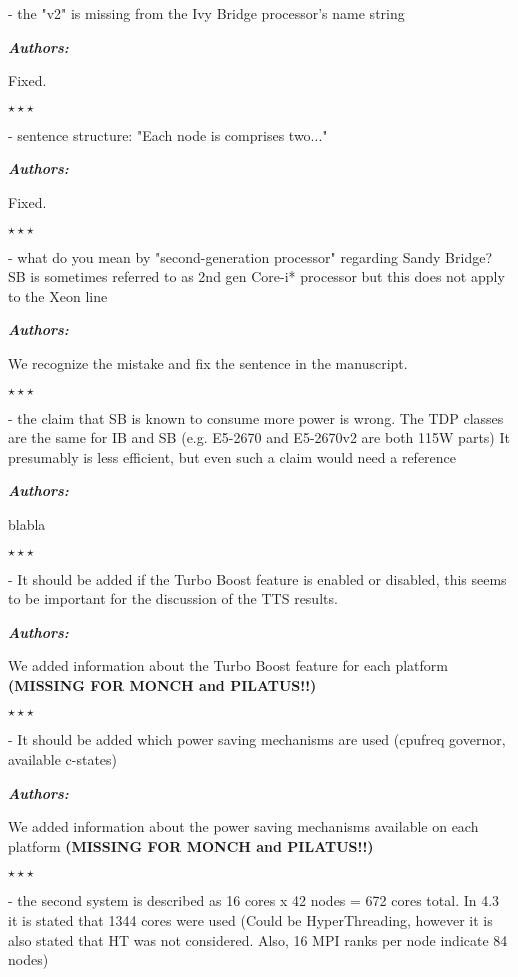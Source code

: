 \documentclass[a4paper,11pt]{article}
\newcounter{question}
\newcommand{\weReply}{\vspace{0.25cm} {\bf \noindent } \addtocounter{question}{1} \textbf{\emph{Authors:}} \medskip \em\par}
\newenvironment{weSay}{\bigskip \weReply \begin{it}}{\end{it}\begin{center} \samepage$\star \star \star$ \end{center}}
\begin{document}
- the "v2" is missing from the Ivy Bridge processor's name string

\begin{weSay}
Fixed.
\end{weSay}

- sentence structure: "Each node is comprises two..."

\begin{weSay}
Fixed.
\end{weSay}

- what do you mean by "second-generation processor" regarding Sandy Bridge?
     SB is sometimes referred to as 2nd gen Core-i* processor but this does not
     apply to the Xeon line

\begin{weSay}
We recognize the mistake and fix the sentence in the manuscript.
\end{weSay}

- the claim that SB is known to consume more power is wrong. The TDP classes
     are the same for IB and SB (e.g. E5-2670 and E5-2670v2 are both 115W parts)
     It presumably is less efficient, but even such a claim would need a reference

\begin{weSay}
blabla
\end{weSay}

- It should be added if the Turbo Boost feature is enabled or disabled, this
     seems to be important for the discussion of the TTS results.

\begin{weSay}
We added information about the Turbo Boost feature for each platform \textbf{(MISSING FOR MONCH and PILATUS!!)}
\end{weSay}

- It should be added which power saving mechanisms are used (cpufreq
     governor, available c-states)

\begin{weSay}
We added information about the power saving mechanisms available on each platform \textbf{(MISSING FOR MONCH and PILATUS!!)}
\end{weSay}

- the second system is described as 16 cores x 42 nodes = 672 cores total. In
     4.3 it is stated that 1344 cores were used (Could be HyperThreading, however
     it is also stated that HT was not considered. Also, 16 MPI ranks per node
     indicate 84 nodes)
\end{document}

